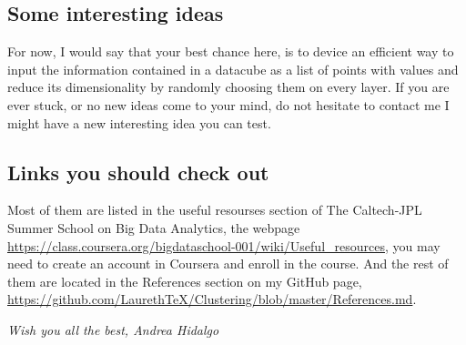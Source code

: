 \documentclass[11pt,fleqn]{book} %
\begin{document}
\subsection{Some interesting ideas}
For now, I would say that your best chance here, is to device an efficient way to input the information contained in a datacube as a list of points with values and reduce its dimensionality by randomly choosing them on every layer. If you are ever stuck, or no new ideas come to your mind, do not hesitate to contact me I might have a new interesting idea you can test.

\subsection{Links you should check out}
Most of them are listed in the useful resourses section of The Caltech-JPL Summer School on Big Data Analytics, the webpage \url{https://class.coursera.org/bigdataschool-001/wiki/Useful_resources}, you may need to create an account in Coursera and enroll in the course. And the rest of them are located in the References section on my GitHub page, \url{https://github.com/LaurethTeX/Clustering/blob/master/References.md}.

\vfill
\textit{Wish you all the best, Andrea Hidalgo}
\end{document}
